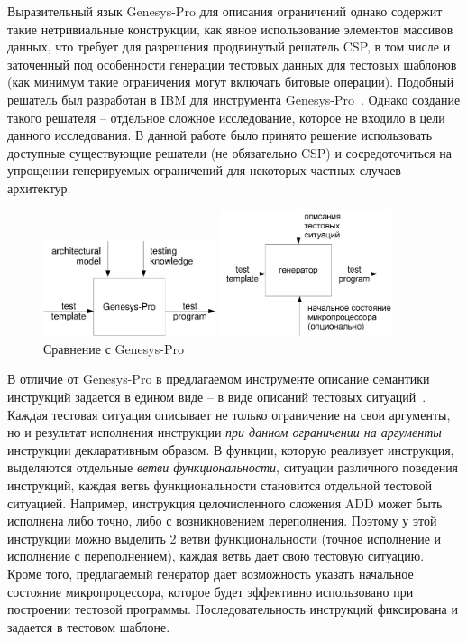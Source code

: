 Выразительный язык Genesys-Pro для описания ограничений однако
содержит такие нетривиальные конструкции, как явное использование
элементов массивов данных, что требует для разрешения продвинутый
решатель CSP, в том числе и заточенный под особенности генерации
тестовых данных для тестовых шаблонов (как минимум такие ограничения
могут включать битовые операции). Подобный решатель был разработан в
IBM для инструмента Genesys-Pro~\cite{GenesysSolver}. Однако
создание такого решателя -- отдельное сложное исследование, которое
не входило в цели данного исследования. В данной работе было принято
решение использовать доступные существующие решатели (не обязательно
CSP) и сосредоточиться на упрощении генерируемых ограничений для
некоторых частных случаев архитектур.

\begin{figure}[h]
\parbox{0.5\textwidth}{ \centering
  \includegraphics[width=0.45\textwidth]{3.impl/genesys-pro}
} \vline
\parbox{0.5\textwidth}{ \centering
  \includegraphics[width=0.45\textwidth]{3.impl/mygen}
}
\caption{Сравнение с Genesys-Pro}\label{comparison_genesyspro}
\end{figure}

В отличие от Genesys-Pro в предлагаемом инструменте описание
семантики инструкций задается в едином виде -- в виде описаний
тестовых ситуаций~\cite{my_syrcose_2008, my_isp_2008}. Каждая
тестовая ситуация описывает не только ограничение на свои аргументы,
но и результат исполнения инструкции \emph{при данном ограничении на
аргументы} инструкции декларативным образом. В функции, которую
реализует инструкция, выделяются отдельные \emph{ветви
функциональности}, ситуации различного поведения инструкций, каждая
ветвь функциональности становится отдельной тестовой ситуацией.
Например, инструкция целочисленного сложения ADD может быть
исполнена либо точно, либо с возникновением переполнения. Поэтому у
этой инструкции можно выделить 2 ветви функциональности (точное
исполнение и исполнение с переполнением), каждая ветвь дает свою
тестовую ситуацию. Кроме того, предлагаемый генератор дает
возможность указать начальное состояние микропроцессора, которое
будет эффективно использовано при построении тестовой программы.
Последовательность инструкций фиксирована и задается в тестовом
шаблоне.

